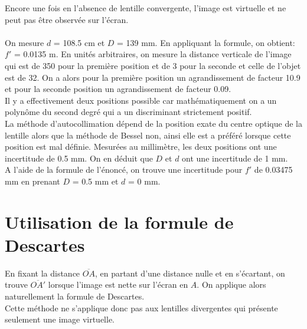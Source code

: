 \documentclass{scrartcl}
\begin{document}
		Encore une fois en l'absence de lentille convergente, l'image est virtuelle et ne peut pas être observée sur l'écran.\\\\
		On mesure $d$ = 108.5 cm et $D$ = 139 mm. En appliquant la formule, on obtient: $f'$ = 0.0135 m. En unités arbitraires, on mesure la distance verticale de l'image qui est de 350 pour la première position et de 3 pour la seconde et celle de l'objet est de 32. On a alors pour la première position un agrandissement de facteur 10.9 et pour la seconde position un agrandissement de facteur 0.09.\\
		Il y a effectivement deux positions possible car mathématiquement on a un polynôme du second degré qui a un discriminant strictement positif.\\ %
		La méthode d'autocollimation dépend de la position exate du centre optique de la lentille alors que la méthode de Bessel non, ainsi elle est a préféré lorsque cette position est mal définie.
		Mesurées au millimètre, les deux positions ont une incertitude de 0.5 mm. On en déduit que $D$ et $d$ ont une incertitude de 1 mm.\\
		A l'aide de la formule de l'énoncé, on trouve une incertitude pour $f'$ de 0.03475 mm en prenant $D$ = 0.5 mm et $d$ = 0 mm.
		
		\section{Utilisation de la formule de Descartes}
		
		En fixant la distance $\overline{OA}$, en partant d'une distance nulle et en s'écartant, on trouve $\overline{OA'}$ lorsque l'image est nette sur l'écran en $A$. On applique alors naturellement la formule de Descartes.\\
		Cette méthode ne s'applique donc pas aux lentilles divergentes qui présente seulement une image virtuelle.
\end{document}
